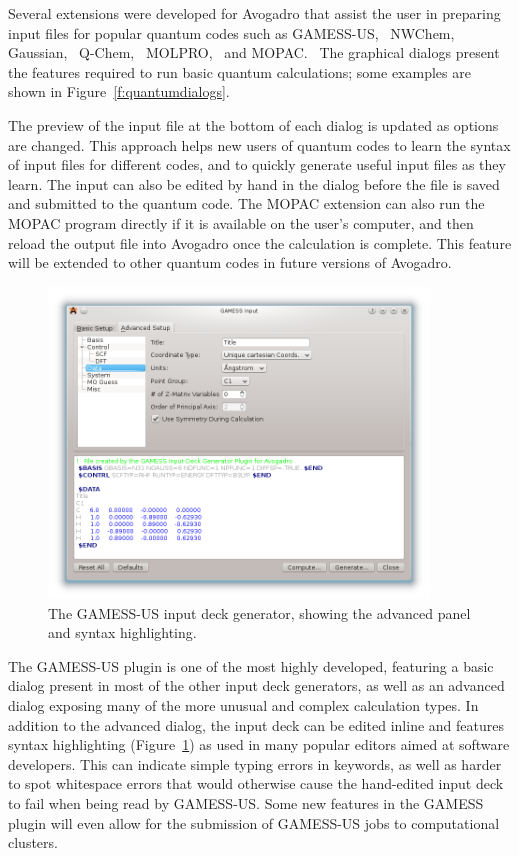 \documentclass[10pt]{bmc_article}
\newenvironment{bmcformat}{\begin{raggedright}
\baselineskip20pt\sloppy\setboolean{publ}{false}}{\end{raggedright}
\baselineskip20pt\sloppy}
\begin{document}
\begin{bmcformat}
Several extensions were developed for Avogadro that assist the user in preparing
input files for popular quantum codes such as
GAMESS-US,~\cite{GAMESS-US} NWChem,~\cite{NWChem}
Gaussian,~\cite{g09} Q-Chem,~\cite{Q-Chem3} MOLPRO,~\cite{MOLPRO}
and MOPAC.~\cite{MOPAC} The graphical dialogs present the features
required to run basic quantum calculations; some examples are shown in
Figure~\ref{f:quantumdialogs}.

The preview of the input file at the bottom of each dialog is updated as options
are changed. This approach helps new users of quantum codes to learn the syntax
of input files for different codes, and to quickly generate useful input files
as they learn. The input can also be edited by hand in the dialog before the file is saved
and submitted to the quantum code. The MOPAC extension can also run the MOPAC
program directly if it is available on the user's computer, and then reload the
output file into Avogadro once the calculation is complete. This
feature will be extended to other quantum codes in future versions of Avogadro.

\begin{figure}
  \begin{center}
    \includegraphics[width=0.9\textwidth]{images/gamess-input}
  \end{center}
  \caption{The GAMESS-US input deck generator, showing the advanced panel and syntax highlighting.}
  \label{f:gamess}
\end{figure}

The GAMESS-US plugin is one of the most highly developed, featuring a basic dialog
present in most of the other input deck generators, as well as an advanced dialog
exposing many of the more unusual and complex calculation types. In addition to
the advanced dialog, the input deck can be edited inline and features syntax
highlighting (Figure~\ref{f:gamess}) as used in many popular editors aimed at software developers. This
can indicate simple typing errors in keywords, as well as harder to spot whitespace
errors that would otherwise cause the hand-edited input deck to fail when being
read by GAMESS-US. Some new features in the GAMESS plugin will even allow
for the submission of GAMESS-US jobs to computational clusters.


\end{bmcformat}
\end{document}
